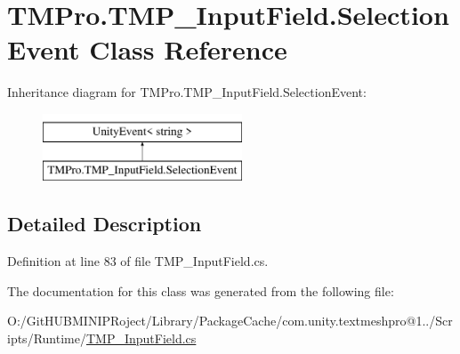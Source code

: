 \hypertarget{class_t_m_pro_1_1_t_m_p___input_field_1_1_selection_event}{}\section{T\+M\+Pro.\+T\+M\+P\+\_\+\+Input\+Field.\+Selection\+Event Class Reference}
\label{class_t_m_pro_1_1_t_m_p___input_field_1_1_selection_event}
Inheritance diagram for T\+M\+Pro.\+T\+M\+P\+\_\+\+Input\+Field.\+Selection\+Event\+:\begin{figure}[H]
\begin{center}
\leavevmode
\includegraphics[height=2.000000cm]{class_t_m_pro_1_1_t_m_p___input_field_1_1_selection_event}
\end{center}
\end{figure}


\subsection{Detailed Description}


Definition at line 83 of file T\+M\+P\+\_\+\+Input\+Field.\+cs.



The documentation for this class was generated from the following file\+:\begin{DoxyCompactItemize}
\item 
O\+:/\+Git\+H\+U\+B\+M\+I\+N\+I\+P\+Roject/\+Library/\+Package\+Cache/com.\+unity.\+textmeshpro@1../\+Scripts/\+Runtime/\mbox{\hyperlink{_t_m_p___input_field_8cs}{T\+M\+P\+\_\+\+Input\+Field.\+cs}}\end{DoxyCompactItemize}
